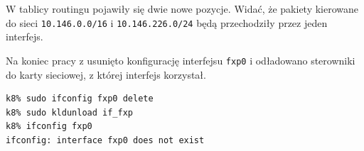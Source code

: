 W tablicy routingu pojawiły się dwie nowe pozycje. Widać, że pakiety kierowane
do sieci \texttt{10.146.0.0/16} i \texttt{10.146.226.0/24} będą przechodziły
przez jeden interfejs.

Na koniec pracy z \eth{} usunięto konfigurację interfejsu \texttt{fxp0} i
odładowano sterowniki do karty sieciowej, z której interfejs korzystał.

\begin{lstlisting}
k8% sudo ifconfig fxp0 delete
k8% sudo kldunload if_fxp
k8% ifconfig fxp0
ifconfig: interface fxp0 does not exist
\end{lstlisting}
